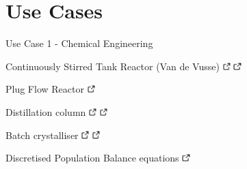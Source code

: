 \documentclass[compress,newPxFont,sthlmFooter]{beamer}
\begin{document}
\section{Use Cases} 

\begin{frame}[plain]{Use Case 1 - Chemical Engineering}
    \begin{itemize}
       {\small
          \item \alert{Continuously Stirred Tank Reactor} (Van de Vusse)
                \href{https://doi.org/10.1021/i160048a700}{\includegraphics[align=b, height=0.8em]{link.png}} 
                \href{http://daetools.com/docs/tutorials-chemeng.html\#tutorial-che-1}{\includegraphics[align=b, height=0.8em]{link.png}}
          \item \alert{Plug Flow Reactor}
                \href{http://daetools.com/docs/tutorials-chemeng.html\#tutorial-che-7}{\includegraphics[align=b, height=0.8em]{link.png}}
          \item \alert{Distillation column}
                \href{http://dx.doi.org/10.1016/S0098-1354(02)00120-5}{\includegraphics[align=b, height=0.8em]{link.png}} 
                \href{http://daetools.com/docs/tutorials-chemeng.html\#tutorial-che-2}{\includegraphics[align=b, height=0.8em]{link.png}}
          \item \alert{Batch crystalliser}
                \href{http://dx.doi.org/10.1016/j.jcrysgro.2011.06.016}{\includegraphics[align=b, height=0.8em]{link.png}} 
                \href{http://daetools.com/docs/tutorials-chemeng.html\#tutorial-che-3}{\includegraphics[align=b, height=0.8em]{link.png}}
          \item \alert{Discretised Population Balance equations}
                \href{http://dx.doi.org/10.20944/preprints201611.0012.v1}{\includegraphics[align=b, height=0.8em]{link.png}} 
}
\end{itemize}
\end{frame}
\end{document}
